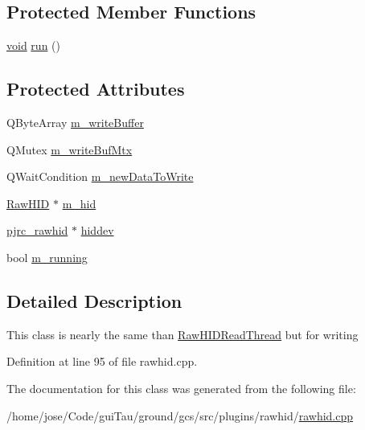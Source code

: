 \subsection*{Protected Member Functions}
\begin{DoxyCompactItemize}
\item 
\hyperlink{group___u_a_v_objects_plugin_ga444cf2ff3f0ecbe028adce838d373f5c}{void} \hyperlink{group___raw_h_i_d_plugin_gaac9f3dfe020b10edc1c5677e07b36d04}{run} ()
\end{DoxyCompactItemize}
\subsection*{Protected Attributes}
\begin{DoxyCompactItemize}
\item 
Q\-Byte\-Array \hyperlink{group___raw_h_i_d_plugin_ga4b0316d5c6599d45686fc5066a246e7e}{m\-\_\-write\-Buffer}
\item 
Q\-Mutex \hyperlink{group___raw_h_i_d_plugin_gaa53a045dd368b7ad82ac5853679019e0}{m\-\_\-write\-Buf\-Mtx}
\item 
Q\-Wait\-Condition \hyperlink{group___raw_h_i_d_plugin_ga1554ff98394a7da1f15042ff26061348}{m\-\_\-new\-Data\-To\-Write}
\item 
\hyperlink{class_raw_h_i_d}{Raw\-H\-I\-D} $\ast$ \hyperlink{group___raw_h_i_d_plugin_ga753f0d79e5633e60df867fe7c35dd6e4}{m\-\_\-hid}
\item 
\hyperlink{classpjrc__rawhid}{pjrc\-\_\-rawhid} $\ast$ \hyperlink{group___raw_h_i_d_plugin_ga7ce382fd2ebb17e10007aed01dea1d6f}{hiddev}
\item 
bool \hyperlink{group___raw_h_i_d_plugin_gaf4f4725b8f0b6ed4b9b5c751397d0abe}{m\-\_\-running}
\end{DoxyCompactItemize}


\subsection{Detailed Description}
This class is nearly the same than \hyperlink{class_raw_h_i_d_read_thread}{Raw\-H\-I\-D\-Read\-Thread} but for writing 

Definition at line 95 of file rawhid.\-cpp.



The documentation for this class was generated from the following file\-:\begin{DoxyCompactItemize}
\item 
/home/jose/\-Code/gui\-Tau/ground/gcs/src/plugins/rawhid/\hyperlink{rawhid_8cpp}{rawhid.\-cpp}\end{DoxyCompactItemize}
